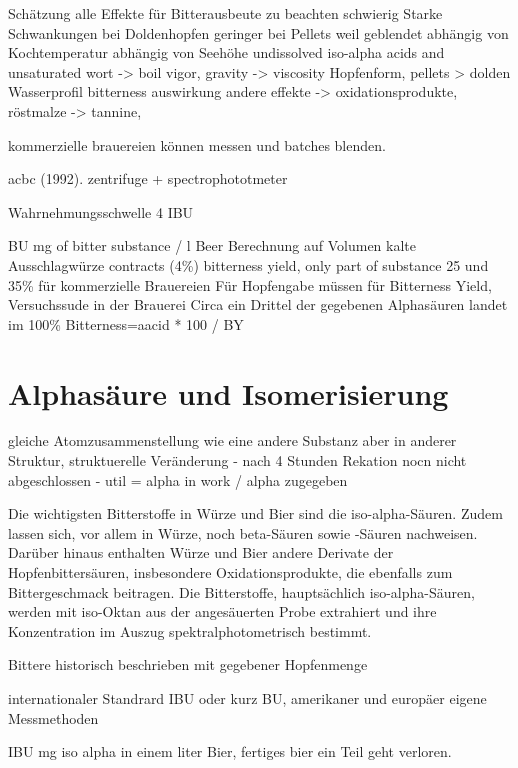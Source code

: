 \documentclass[a4paper,parskip=half]{scrartcl}
\begin{document}
\parencite[58]{Hall1997}
Schätzung alle Effekte für Bitterausbeute zu beachten schwierig
Starke Schwankungen bei Doldenhopfen
geringer bei Pellets weil geblendet
abhängig von Kochtemperatur abhängig von Seehöhe
undissolved iso-alpha acids and unsaturated wort -> boil vigor, gravity -> viscosity
Hopfenform, pellets > dolden
Wasserprofil bitterness auswirkung
andere effekte -> oxidationsprodukte, röstmalze -> tannine, 

kommerzielle brauereien können messen und batches blenden.

acbc (1992). zentrifuge + spectrophototmeter

Wahrnehmungsschwelle 4 IBU





\parencite[320]{Kunze2004}
BU mg of bitter substance / l Beer
Berechnung auf Volumen kalte Ausschlagwürze contracts (4\%)
bitterness yield, only part of substance
25 und 35\% für kommerzielle Brauereien
Für Hopfengabe müssen für Bitterness Yield, Versuchssude in der Brauerei
Circa ein Drittel der gegebenen Alphasäuren landet im 
100\% Bitterness=aacid * 100 / BY


\section*{Alphasäure und Isomerisierung}

\parencite[51]{Davidson1997} gleiche Atomzusammenstellung wie
eine andere Substanz aber in anderer Struktur, struktuerelle
Veränderung
- nach 4 Stunden Rekation nocn nicht abgeschlossen
- util = alpha in work / alpha zugegeben

\parencite{MEBAK2020}
Die wichtigsten Bitterstoffe in Würze und Bier sind die iso-alpha-Säuren. Zudem lassen sich, vor allem in Würze, noch beta-Säuren sowie -Säuren nachweisen. Darüber hinaus enthalten Würze und Bier andere Derivate der Hopfenbittersäuren, insbesondere Oxidationsprodukte, die ebenfalls zum Bittergeschmack beitragen.
Die Bitterstoffe, hauptsächlich iso-alpha-Säuren, werden mit iso-Oktan aus der
angesäuerten Probe extrahiert und ihre Konzentration im Auszug spektralphotometrisch bestimmt.



\parencite[120\psq]{Garetz1994}
Bittere historisch beschrieben mit gegebener Hopfenmenge

internationaler Standrard IBU oder kurz BU, amerikaner und
europäer eigene Messmethoden
 
\parencite[121]{Garetz1994} 
IBU mg iso alpha in einem liter Bier, fertiges bier
ein Teil geht verloren. 
\end{document}
